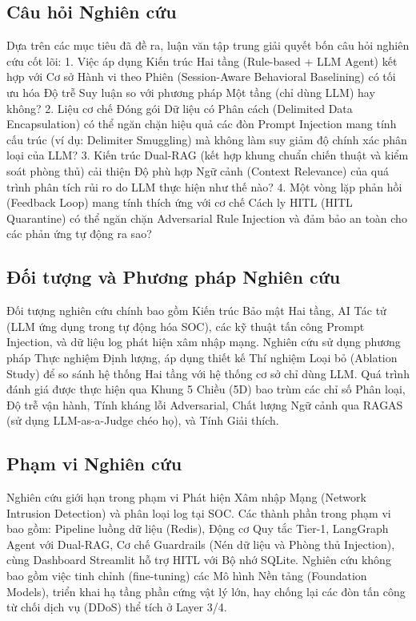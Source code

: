 \documentclass[12pt,a4paper]{article}
\begin{document}
\subsection{Câu hỏi Nghiên cứu}
Dựa trên các mục tiêu đã đề ra, luận văn tập trung giải quyết bốn câu hỏi nghiên cứu cốt lõi:
1. Việc áp dụng Kiến trúc Hai tầng (Rule-based + LLM Agent) kết hợp với Cơ sở Hành vi theo Phiên (Session-Aware Behavioral Baselining) có tối ưu hóa Độ trễ Suy luận so với phương pháp Một tầng (chỉ dùng LLM) hay không?
2. Liệu cơ chế Đóng gói Dữ liệu có Phân cách (Delimited Data Encapsulation) có thể ngăn chặn hiệu quả các đòn Prompt Injection mang tính cấu trúc (ví dụ: Delimiter Smuggling) mà không làm suy giảm độ chính xác phân loại của LLM?
3. Kiến trúc Dual-RAG (kết hợp khung chuẩn chiến thuật và kiểm soát phòng thủ) cải thiện Độ phù hợp Ngữ cảnh (Context Relevance) của quá trình phân tích rủi ro do LLM thực hiện như thế nào?
4. Một vòng lặp phản hồi (Feedback Loop) mang tính thích ứng với cơ chế Cách ly HITL (HITL Quarantine) có thể ngăn chặn Adversarial Rule Injection và đảm bảo an toàn cho các phản ứng tự động ra sao?

\subsection{Đối tượng và Phương pháp Nghiên cứu}
Đối tượng nghiên cứu chính bao gồm Kiến trúc Bảo mật Hai tầng, AI Tác tử (LLM ứng dụng trong tự động hóa SOC), các kỹ thuật tấn công Prompt Injection, và dữ liệu log phát hiện xâm nhập mạng.
Nghiên cứu sử dụng phương pháp Thực nghiệm Định lượng, áp dụng thiết kế Thí nghiệm Loại bỏ (Ablation Study) để so sánh hệ thống Hai tầng với hệ thống cơ sở chỉ dùng LLM. Quá trình đánh giá được thực hiện qua Khung 5 Chiều (5D) bao trùm các chỉ số Phân loại, Độ trễ vận hành, Tính kháng lỗi Adversarial, Chất lượng Ngữ cảnh qua RAGAS (sử dụng LLM-as-a-Judge chéo họ), và Tính Giải thích.

\subsection{Phạm vi Nghiên cứu}
Nghiên cứu giới hạn trong phạm vi Phát hiện Xâm nhập Mạng (Network Intrusion Detection) và phân loại log tại SOC. Các thành phần trong phạm vi bao gồm: Pipeline luồng dữ liệu (Redis), Động cơ Quy tắc Tier-1, LangGraph Agent với Dual-RAG, Cơ chế Guardrails (Nén dữ liệu và Phòng thủ Injection), cùng Dashboard Streamlit hỗ trợ HITL với Bộ nhớ SQLite. Nghiên cứu không bao gồm việc tinh chỉnh (fine-tuning) các Mô hình Nền tảng (Foundation Models), triển khai hạ tầng phần cứng vật lý lớn, hay chống lại các đòn tấn công từ chối dịch vụ (DDoS) thể tích ở Layer 3/4.
\end{document}
